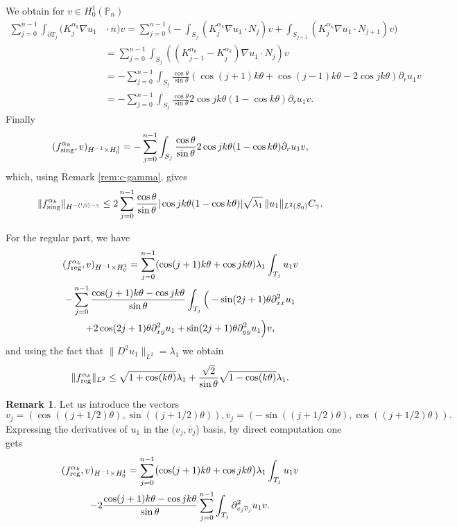 \documentclass[JEP,XML,SOM,Unicode,ThmDefs,NoFloatCountersInSection,published]{cedram}
\newcommand{\Psfrac}[2]{(\sfrac{#1}{#2})}
\theoremstyle{plain}
\theoremstyle{definition}
\newtheorem{rem}[thm]{Remark}
\newcommand{\reg}{\textup{reg}}
\newcommand{\sing}{\textup{sing}}
\def\Pp{{\mathbb{P}_n}}
\newcommand{\lb}{\lambda}
\begin{document}
We obtain for $v \in H_0^1(\Pp)$
\begin{align*}
\sum_{j=0}^{n-1} \int_{\partial T_j} (K_j^{\alpha_k}\nabla u_1 &{}\cdot n) v = \sum_{j=0}^{n-1}\biggl(- \int_{S_j} (K_j^{\alpha_k}\nabla u_1 \cdot N_j) v
+\int_{S_{j+1}} (K_j^{\alpha_k}\nabla u_1 \cdot N_{j+1})v
\biggr) \\
&= \sum_{j=0}^{n-1} \int_{S_j}((K_{j-1}^{\alpha_k}-K_j^{\alpha_k})\nabla u_1 \cdot N_j) v
\\
&= -\sum_{j=0}^{n-1}\int_{S_j} \frac{\cos \theta}{\sin \theta} (\cos (j+1)k\theta+\cos (j-1)k\theta - 2 \cos jk\theta) \partial_r u_1 v \\
&= -\sum_{j=0}^{n-1}\int_{S_j} \frac{\cos \theta}{\sin \theta} 2 \cos jk\theta(1-\cos k \theta) \partial_r u_1 v.
\end{align*}
Finally
\[
(f_{\sing}^{\alpha_k}, v)_{H^{-1}\times H^1_0} = -\sum_{j=0}^{n-1}\int_{S_j} \frac{\cos \theta}{\sin \theta} 2 \cos jk\theta(1-\cos k \theta) \partial_r u_1 v,
\]
which, using Remark \ref{rem:c-gamma}, gives
\[
\|f_{\sing}^{\alpha_k}\|_{H^{-\Psfrac 12-\gamma}}\le 2\sum_{j=0}^{n-1} \frac{\cos \theta}{\sin \theta} | \cos jk\theta(1-\cos k \theta)| \sqrt{\lb_1}\,\|u_1\|_{L^2(S_0)} C_\gamma.
\]

For the regular part, we have\vspace*{-5pt}
\begin{multline*}(f_{\reg}^{\alpha_k}, v)_{H^{-1}\times H^1_0}= \sum_{j=0}^{n-1} (\cos (j+1)k\theta+\cos jk\theta) \lb_1 \int_{T_j} u_1v\\
- \sum_{j=0}^{n-1} {\frac{\cos(j+1)k\theta-\cos jk\theta}{\sin \theta}} \int_{T_j} \Big (-\sin (2j+1)\theta \partial^2_{xx}u_1 \\
+ 2 \cos (2j+1)\theta \partial^2_{xy} u_1+ \sin(2j+1)\theta \partial^2_{yy} u_1\Big)v,
\end{multline*}
and using the fact that $\|D^2 u_1\|_{L^2} = \lambda_1$ we obtain
\[
\|f^{\alpha_k}_{\reg}\|_{L^2}\le \sqrt{1+\cos (k \theta)} \lb_1 +\frac{\sqrt{2}}{\sin \theta} \sqrt{1- \cos (k \theta)}\lb_1 .
\]

\begin{rem}
Let us introduce the vectors
\[
v_j=(\cos((j+1/2)\theta), \sin ((j+1/2)\theta)), \overline v_j= (-\sin((j+1/2)\theta), \cos ((j+1/2)\theta)).
\]
Expressing the derivatives of $u_1$ in the $(v_j, \overline v_j$) basis, by direct computation one gets\vspace*{-5pt}
\begin{multline*}
(f_{\reg}^{\alpha_k}, v)_{H^{-1}\times H^1_0}
=\sum_{j=0}^{n-1} \bigl(\cos (j+1)k\theta+\cos jk\theta\bigr) \lb_1 \int_{T_j} u_1v\\
-2 \frac{\cos(j+1)k\theta-\cos jk\theta}{\sin \theta} \sum_{j=0}^{n-1} \int_{T_j} \partial^2_{v_j\overline v_j}u_1 v.
\end{multline*}
\label{rem:reg-part-change-basis}
\end{rem}
\end{document}

